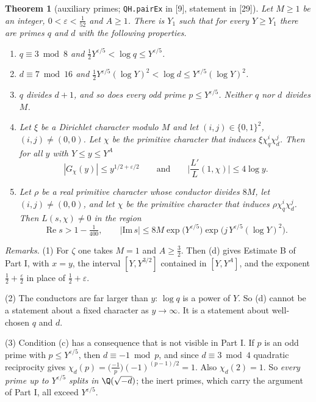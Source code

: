 \documentclass[11pt,letterpaper]{article}
\newtheorem{theorem}{Theorem}[section]
\newcommand{\re}{\operatorname{Re}}
\begin{document}
\begin{theorem}[auxiliary primes; \texttt{QH.pairEx} in {[9]}, statement in {[29]}]\label{thm:pair}
Let $M\ge1$ be an integer, $0<\varepsilon<\frac1{52}$ and $A\ge1$. There is $Y_1$ such that for every
$Y\ge Y_1$ there are primes $q$ and $d$ with the following properties.
\begin{enumerate}[label=\textup{(\alph*)},leftmargin=2.2em]
\item $q\equiv3\bmod8$ and $\frac12Y^{\varepsilon/5}<\log q\le Y^{\varepsilon/5}$.
\item $d\equiv7\bmod16$ and $\frac12Y^{\varepsilon/5}(\log Y)^2<\log d\le Y^{\varepsilon/5}(\log Y)^2$.
\item $q$ divides $d+1$, and so does every odd prime $p\le Y^{\varepsilon/5}$. Neither $q$ nor $d$ divides $M$.
\item Let $\xi$ be a Dirichlet character modulo $M$ and let $(i,j)\in\{0,1\}^2$, $(i,j)\ne(0,0)$. Let $\chi$ be
the primitive character that induces $\xi\chi_q^i\chi_d^j$. Then for all $y$ with $Y\le y\le Y^A$
\begin{equation}\label{D:112}
 |G_\chi(y)|\le y^{1/2+\varepsilon/2}\qquad\text{and}\qquad\Big|\frac{L'}{L}(1,\chi)\Big|\le4\log y .
\end{equation}
\item Let $\rho$ be a real primitive character whose conductor divides $8M$, let $(i,j)\ne(0,0)$, and let
$\chi$ be the primitive character that induces $\rho\chi_q^i\chi_d^j$. Then $L(s,\chi)\ne0$ in the region
\begin{equation}\label{D:113}
 \re s>1-\tfrac1{400},\qquad |\mathrm{Im}\,s|\le 8M\exp\!\big(Y^{\varepsilon/5}\big)\exp\!\big(j\,Y^{\varepsilon/5}(\log Y)^2\big).
\end{equation}
\end{enumerate}
\end{theorem}

\noindent\emph{Remarks.} (1) For $\zeta$ one takes $M=1$ and $A\ge\frac32$. Then (d) gives Estimate B of Part I, with $x=y$, the interval $[Y,Y^{3/2}]$ contained in $[Y,Y^A]$, and the
exponent $\frac12+\frac\varepsilon2$ in place of $\frac12+\varepsilon$.

(2) The conductors are far larger than $y$: $\log q$ is a power of $Y$. So (d) cannot be a statement about
a fixed character as $y\to\infty$. It is a statement about well-chosen $q$ and $d$.

(3) Condition (c) has a consequence that is not visible in Part I. If $p$ is an odd prime with
$p\le Y^{\varepsilon/5}$, then $d\equiv-1\bmod p$, and since $d\equiv3\bmod4$ quadratic reciprocity gives
$\chi_d(p)=\big(\tfrac{-1}p\big)(-1)^{(p-1)/2}=1$. Also $\chi_d(2)=1$. So \emph{every prime up to
$Y^{\varepsilon/5}$ splits in $\Q(\sqrt{-d})$}; the inert primes, which carry the argument of Part I, all
exceed $Y^{\varepsilon/5}$.
\end{document}
